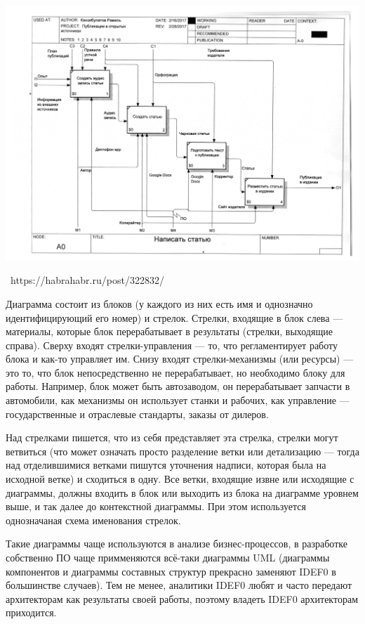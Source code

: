 \documentclass[a5paper]{article}
\newcommand{\attribution}[1] {
	\vspace{-5mm}\begin{flushright}\begin{scriptsize}%
	{\textcopyright\, #1}\end{scriptsize}\end{flushright}
}
\begin{document}
\begin{center}
	\includegraphics[width=\textwidth]{idef0.png}
	\attribution{https://habrahabr.ru/post/322832/}
\end{center}

Диаграмма состоит из блоков (у каждого из них есть имя и однозначно идентифицирующий его номер) и стрелок. Стрелки, входящие в блок слева --- материалы, которые блок перерабатывает в результаты (стрелки, выходящие справа). Сверху входят стрелки-управления --- то, что регламентирует работу блока и как-то управляет им. Снизу входят стрелки-механизмы (или ресурсы) --- это то, что блок непосредственно не перерабатывает, но необходимо блоку для работы. Например, блок может быть автозаводом, он перерабатывает запчасти в автомобили, как механизмы он использует станки и рабочих, как управление --- государственные и отраслевые стандарты, заказы от дилеров.

Над стрелками пишется, что из себя представляет эта стрелка, стрелки могут ветвиться (что может означать просто разделение ветки или детализацию --- тогда над отделившимися ветками пишутся уточнения надписи, которая была на исходной ветке) и сходиться в одну. Все ветки, входящие извне или исходящие с диаграммы, должны входить в блок или выходить из блока на диаграмме уровнем выше, и так далее до контекстной диаграммы. При этом используется однозначаная схема именования стрелок.

Такие диаграммы чаще используются в анализе бизнес-процессов, в разработке собственно ПО чаще примменяются всё-таки диаграммы UML (диаграммы компонентов и диаграммы составных структур прекрасно заменяют IDEF0 в большинстве случаев). Тем не менее, аналитики IDEF0 любят и часто передают архитекторам как результаты своей работы, поэтому владеть IDEF0 архитекторам приходится.
\end{document}
